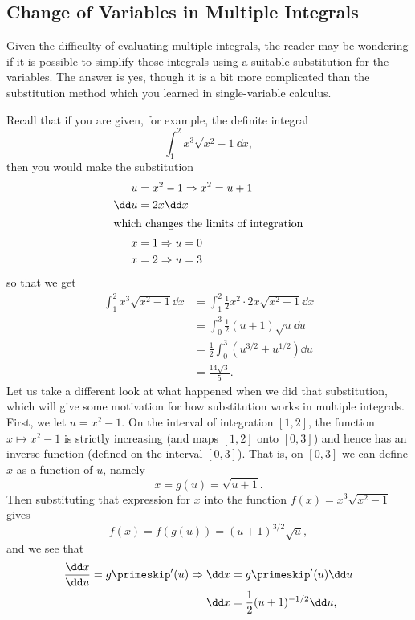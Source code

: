 
\subsection{Change of Variables in Multiple Integrals}

Given the difficulty of evaluating multiple integrals, the reader may be wondering if it is possible to simplify those integrals using a suitable substitution for the variables. The answer is yes, though it is a bit more complicated than the substitution method which you learned in single-variable calculus.

Recall that if you are given, for example, the definite integral
\[\int_1^2 x^3 \sqrt{x^2 - 1}\dd x ,\]
then you would make the substitution
\begin{align*}
u &= x^2 - 1 \Rightarrow x^2 = u + 1\\
\dd u &= 2x\dd x\\
\intertext{which changes the limits of integration}
x &= 1 \Rightarrow u = 0\\
x &= 2 \Rightarrow u = 3
\end{align*}
so that we get
\begin{align*}
 \int_1^2 x^3 \sqrt{x^2 - 1}\dd x &= \int_1^2 \frac12 x^2 \cdot 2x \sqrt{x^2 - 1}\dd x\\
 &= \int_0^3 \frac12 (u+1)\sqrt{u}\dd u\\
 &= \frac12 \int_0^3 \left( u^{3/2} + u^{1/2} \right)\dd u \\
 &= \frac{14\sqrt3}5 .
\end{align*}
Let us take a different look at what happened when we did that substitution, which will give some motivation for how substitution works in multiple integrals. First, we let $u = x^2 - 1$. On the interval of integration $[ 1,2 ]$, the function $x \mapsto x^2 - 1$ is strictly increasing (and maps $[ 1,2 ]$ onto $[ 0,3 ]$) and hence has an inverse function (defined on the interval $[ 0,3 ]$). That is, on $[ 0,3 ]$ we can define $x$ as a function of $u$, namely
\[x = g(u) = \sqrt{u+1} .\]
Then substituting that expression for $x$ into the function $f(x) = x^3 \sqrt{x^2 - 1}$ gives
\[f(x) = f(g(u)) = (u+1)^{3/2} \sqrt{u} ,\]
and we see that
\begin{align*}
 \frac{\dd x}{\dd u} = g\primeskip'(u) \Rightarrow \dd x &= g\primeskip'(u)\dd u\\
 \dd x &= \frac12 (u+1)^{-1/2}\dd u ,
\end{align*}
